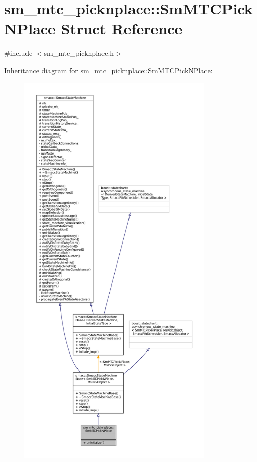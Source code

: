 \hypertarget{structsm__mtc__picknplace_1_1SmMTCPickNPlace}{}\section{sm\+\_\+mtc\+\_\+picknplace\+:\+:Sm\+M\+T\+C\+Pick\+N\+Place Struct Reference}
\label{structsm__mtc__picknplace_1_1SmMTCPickNPlace}


{\ttfamily \#include $<$sm\+\_\+mtc\+\_\+picknplace.\+h$>$}



Inheritance diagram for sm\+\_\+mtc\+\_\+picknplace\+:\+:Sm\+M\+T\+C\+Pick\+N\+Place\+:
\nopagebreak
\begin{figure}[H]
\begin{center}
\leavevmode
\includegraphics[height=550pt]{structsm__mtc__picknplace_1_1SmMTCPickNPlace__inherit__graph}
\end{center}
\end{figure}



